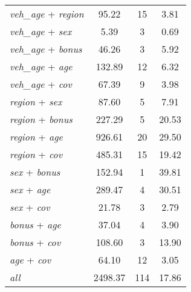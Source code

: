 {\begin{ThreePartTable}
\begin{longtable}{lccc}
    \textit{veh\_age} + \textit{region} &    95.22 &       15 &     3.81 \\
    \textit{veh\_age} + \textit{sex} &     5.39 &        3 &     0.69 \\
    \textit{veh\_age} + \textit{bonus} &    46.26 &        3 &     5.92 \\
    \textit{veh\_age} + \textit{age} &   132.89 &       12 &     6.32 \\
    \textit{veh\_age} + \textit{cov} &    67.39 &        9 &     3.98 \\
    \textit{region} + \textit{sex} &    87.60 &        5 &     7.91 \\
    \textit{region} + \textit{bonus} &   227.29 &        5 &    20.53 \\
    \textit{region} + \textit{age} &   926.61 &       20 &    29.50 \\
    \textit{region} + \textit{cov} &   485.31 &       15 &    19.42 \\
    \textit{sex} + \textit{bonus} &   152.94 &        1 &    39.81 \\
    \textit{sex} + \textit{age} &   289.47 &        4 &    30.51 \\
    \textit{sex} + \textit{cov} &    21.78 &        3 &     2.79 \\
    \textit{bonus} + \textit{age} &    37.04 &        4 &     3.90 \\
    \textit{bonus} + \textit{cov} &   108.60 &        3 &    13.90 \\
    \textit{age} + \textit{cov} &    64.10 &       12 &     3.05 \\
    \textit{all}\tnote{\ddag} &  2498.37 &      114 &    17.86 \\

\end{longtable}
\end{ThreePartTable}
}
